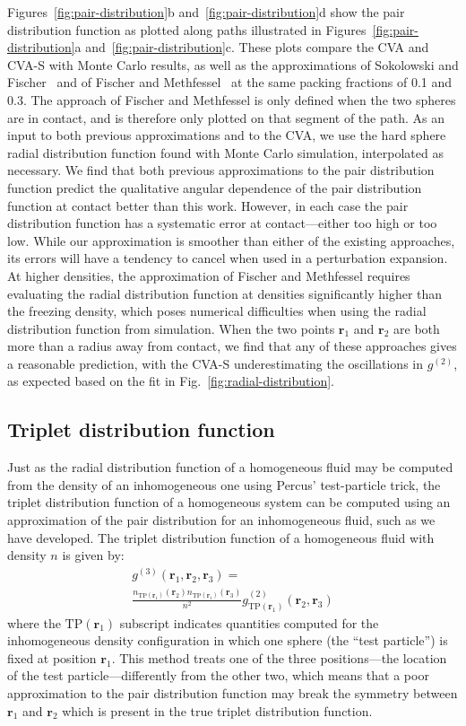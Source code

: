\documentclass[letterpaper,twocolumn,amsmath,amssymb,pre,aps,10pt]{revtex4-1}
\newcommand{\rr}{\textbf{r}}
\begin{document}
Figures~\ref{fig:pair-distribution}b and~\ref{fig:pair-distribution}d
show the pair distribution function as plotted along paths illustrated
in Figures~\ref{fig:pair-distribution}a
and~\ref{fig:pair-distribution}c.  These plots compare the CVA and
CVA-S with Monte Carlo results, as well as the approximations of
Sokolowski and Fischer~\cite{sokolowski1992role} and of Fischer and
Methfessel~\cite{fischer1980born} at the same packing fractions of 0.1 and 0.3.
The approach of Fischer and Methfessel is only defined when the two
spheres are in contact, and is therefore only plotted on that segment
of the path.  As an input to both previous approximations and to the
CVA, we use the hard sphere radial distribution function found with
Monte Carlo simulation, interpolated as necessary. We find that both
previous approximations to the pair distribution function predict the
qualitative angular dependence of the pair distribution function at
contact better than this work.  However, in each case the pair
distribution function has a systematic error at contact---either too
high or too low.  While our approximation is smoother than either
of the existing approaches, its errors will have a tendency to cancel
when used in a perturbation expansion.  At higher densities, the
approximation of Fischer and Methfessel requires evaluating the radial
distribution function at densities significantly higher than the
freezing density, which poses numerical difficulties when using the
radial distribution function from simulation.  When the two points
$\rr_1$ and $\rr_2$ are both
more than a radius away from contact, we find that any of these
approaches gives a reasonable prediction, with the CVA-S
underestimating the oscillations in $g^{(2)}$, as expected based on
the fit in Fig.~\ref{fig:radial-distribution}.

\subsection{Triplet distribution function}

Just as the radial distribution function of a homogeneous fluid may be
computed from the density of an inhomogeneous one using Percus'
test-particle trick, the triplet distribution function of a
homogeneous system can be computed using an approximation of the pair
distribution for an inhomogeneous fluid, such as we have
developed. The triplet distribution function of a homogeneous fluid
with density $n$ is given by:
\begin{multline}
    g^{(3)}(\rr_1,\rr_2,\rr_3) =\\
    \frac{n_{\textrm{TP}(\rr_1)}(\rr_2)
      n_{\textrm{TP}(\rr_1)}(\rr_3)}{n^2}
    g^{(2)}_{\textrm{TP}(\rr_1)}(\rr_2,\rr_3)
\end{multline}
where the $\textrm{TP}(\rr_1)$ subscript indicates quantities computed for
the inhomogeneous density configuration in which one sphere (the
``test particle'') is fixed
at position $\rr_1$.  This method treats one of the three
positions---the location of the test particle---differently from the
other two, which means that a poor approximation to the pair distribution
function may break the symmetry between $\rr_1$ and $\rr_2$ which is
present in the true triplet distribution function.
\end{document}
